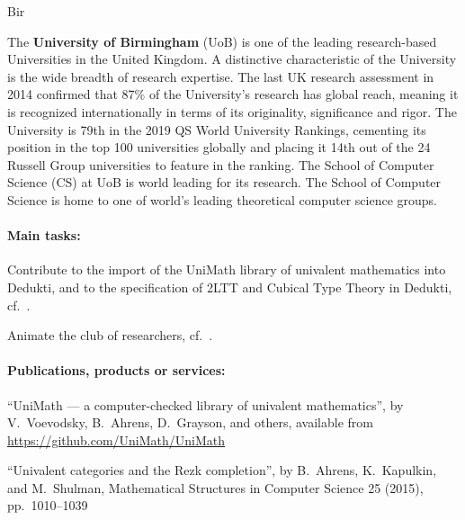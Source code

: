 \begin{sitedescription}{Bir}

The \textbf{University of Birmingham} (UoB) is one of the leading research-based Universities in the United Kingdom. A distinctive
characteristic of the University is the wide breadth of research expertise. The last UK research assessment in 2014 confirmed that
87\% of the University’s research has global reach, meaning it is recognized internationally in terms of its originality, significance and rigor. The University is 79th in the 2019 QS World University Rankings, cementing its position in the top 100 universities globally and placing it 14th out of the 24 Russell Group universities to feature in the ranking. The School of Computer Science (CS) at UoB is world leading for its research. 
The School of Computer Science is home to one of world's leading theoretical computer science groups.

\paragraph{Main tasks:}

\begin{compactitem}
\item Contribute to the import of the UniMath library of univalent mathematics into Dedukti, and to the specification of 2LTT and Cubical Type Theory in Dedukti, cf.\ .
\item Animate the club of researchers, cf.\ .

\item{} 
\end{compactitem}

\paragraph{Publications, products or services:}

\begin{compactitem}
 \item ``UniMath --- a computer-checked library of univalent mathematics'', by V.~Voevodsky, B.~Ahrens, D.~Grayson, and others, available from \url{https://github.com/UniMath/UniMath}
 \item ``Univalent categories and the Rezk completion'', by B.~Ahrens, K.~Kapulkin, and M.~Shulman, Mathematical Structures in Computer Science 25 (2015), pp.~1010--1039
\end{compactitem}


\end{sitedescription}
